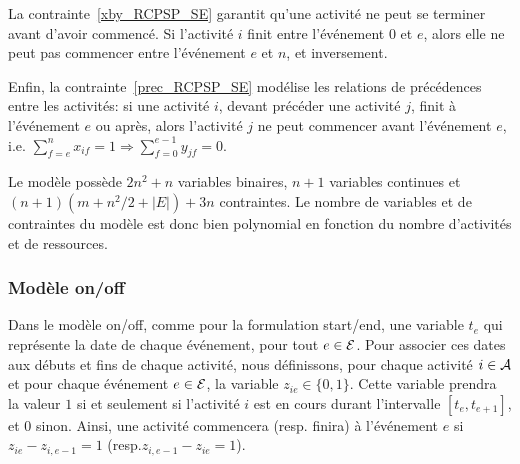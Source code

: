 La contrainte~\eqref{xby_RCPSP_SE} garantit qu'une activité ne
peut se terminer avant d'avoir commencé. Si l'activité $i$ finit
entre l'événement $0$ et $e$, alors elle ne peut pas commencer
entre l'événement $e$ et $n$, et inversement.

Enfin, la contrainte~\eqref{prec_RCPSP_SE} modélise les relations
de précédences entre les activités: si une activité $i$, devant
précéder une activité $j$, finit à l'événement $e$ ou après, alors
l'activité $j$ ne peut commencer avant l'événement $e$, i.e.
$\sum_{f=e}^n x_{if}=1 \Rightarrow \sum_{f=0}^{e-1} y_{jf}=0$.

Le modèle possède $2n^2+n$ variables binaires, $n+1$ variables
continues et $(n+1)(m+n^2/2+|E|)+3n$ contraintes. Le nombre de
variables et de contraintes du modèle est donc bien polynomial en
fonction du nombre d'activités et de ressources.
 
\subsubsection{Modèle on/off} 

Dans le modèle on/off, comme pour la
formulation start/end, une variable $t_e$ qui représente la date
de chaque événement, pour tout $e \in {\cal E}$. Pour associer ces
dates aux débuts et fins de chaque activité, nous définissons, pour
chaque activité $i \in {\cal A}$ et pour chaque événement $e \in {\cal E}$, la
variable $z_{ie} \in \{0,1\}$. Cette variable prendra la valeur
$1$ si et seulement si l'activité $i$ est en cours durant
l'intervalle $[t_e,t_{e+1}]$, et 0 sinon. Ainsi, une activité
commencera (resp. finira) à l'événement $e$ si
$z_{ie}-z_{i,e-1}=1$ (resp.$z_{i,e-1}-z_{ie}=1$).

